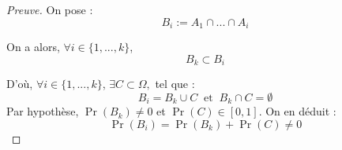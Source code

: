 \begin{proof}[Preuve]
On pose :
$$B_i := A_1\cap...\cap A_i$$

On a alors, $ \forall i\in \{1, ..., k\}$, 
$$B_k\subset B_i$$

D'où, $\forall i\in \{1, ..., k\}$, 
$\exists C \subset \Omega, 
$ tel que :
$$B_i = B_k \cup C ~ \text{ et } ~  B_k\cap C=\emptyset$$
%
Par hypothèse, $\Pr(B_k)\not=0$ et $\Pr(C) \in [0,1]$.
On en déduit : 
$$\Pr(B_i) = \Pr(B_k) + \Pr(C) \not= 0 $$ 
\end{proof}


